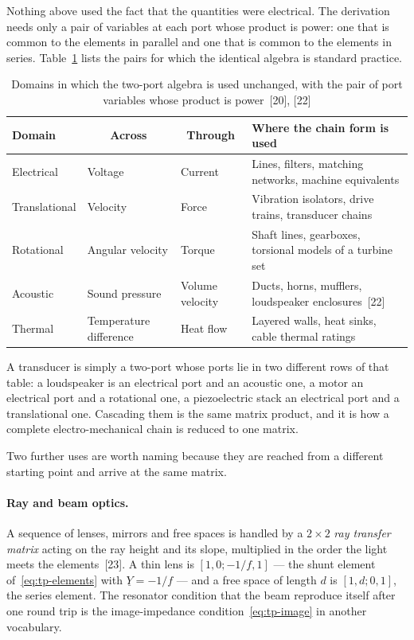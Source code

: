 Nothing above used the fact that the quantities were electrical. The
derivation needs only a pair of variables at each port whose product is
power: one that is common to the elements in parallel and one that is common
to the elements in series. Table~\ref{tab:tp-domains} lists the pairs for
which the identical algebra is standard practice.

\begin{table}[!ht]
  \centering
  \begin{tabularx}{\linewidth}{@{}l l l X@{}}
    \toprule
    \textbf{Domain} & \multicolumn{1}{c}{\textbf{Across}}
      & \multicolumn{1}{c}{\textbf{Through}} & \textbf{Where the chain form is used} \\
    \midrule
    Electrical & Voltage & Current
      & Lines, filters, matching networks, machine equivalents \\
    Translational & Velocity & Force
      & Vibration isolators, drive trains, transducer chains \\
    Rotational & Angular velocity & Torque
      & Shaft lines, gearboxes, torsional models of a turbine set \\
    Acoustic & Sound pressure & Volume velocity
      & Ducts, horns, mufflers, loudspeaker enclosures~[22] \\
    Thermal & Temperature difference & Heat flow
      & Layered walls, heat sinks, cable thermal ratings \\
    \bottomrule
  \end{tabularx}
  \caption{Domains in which the two-port algebra is used unchanged, with the
           pair of port variables whose product is power~[20], [22]}
  \label{tab:tp-domains}
\end{table}

A transducer is simply a two-port whose ports lie in two different rows of
that table: a loudspeaker is an electrical port and an acoustic one, a motor
an electrical port and a rotational one, a piezoelectric stack an electrical
port and a translational one. Cascading them is the same matrix product, and
it is how a complete electro-mechanical chain is reduced to one matrix.

Two further uses are worth naming because they are reached from a different
starting point and arrive at the same matrix.

\paragraph{Ray and beam optics.} A sequence of lenses, mirrors and free
spaces is handled by a $2 \times 2$ \emph{ray transfer matrix} acting on the
ray height and its slope, multiplied in the order the light meets the
elements~[23]. A thin lens is $\left[1, 0; -1/f, 1\right]$ --- the shunt
element of~\eqref{eq:tp-elements} with $\underline{Y} = -1/f$ --- and a free
space of length $d$ is $\left[1, d; 0, 1\right]$, the series element. The
resonator condition that the beam reproduce itself after one round trip is
the image-impedance condition~\eqref{eq:tp-image} in another vocabulary.

